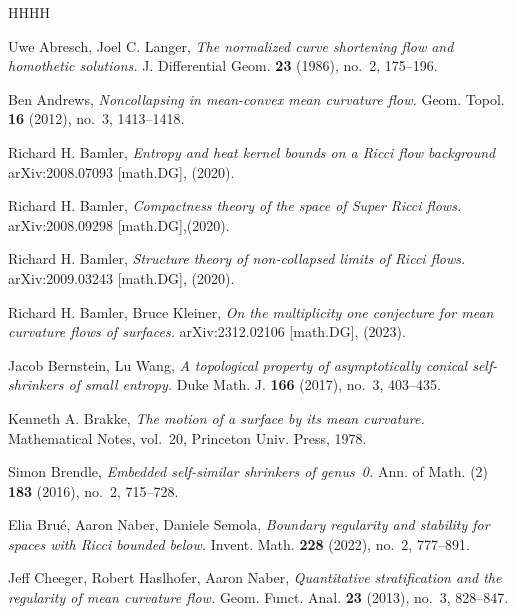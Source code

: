 \documentclass[11pt,reqno]{amsart}
\numberwithin{equation}{section}
\theoremstyle{definition}
\theoremstyle{remark}
\theoremstyle{remark}
\theoremstyle{remark}
\theoremstyle{remark}\newtheorem{conjecture}[equation]{Conjecture}
\theoremstyle{remark}\newtheorem{question}[equation]{Question}
\begin{document}
\begin{thebibliography}{HHHH}







Uwe Abresch, Joel C. Langer,
\emph{The normalized curve shortening flow and homothetic solutions.}
J. Differential Geom. \textbf{23} (1986), no.~2, 175–196.


Ben Andrews,
\emph{Noncollapsing in mean-convex mean curvature flow.}
Geom. Topol. \textbf{16} (2012), no.~3, 1413–1418.



Richard H. Bamler, 
\emph{Entropy and heat kernel bounds on a Ricci flow background}
	arXiv:2008.07093 [math.DG], (2020).


Richard H. Bamler, 
    \emph{Compactness theory of the space of Super Ricci flows.}
	arXiv:2008.09298 [math.DG],(2020).

    Richard H. Bamler, 
 \emph{ Structure theory of non-collapsed limits of Ricci flows.}
	arXiv:2009.03243 [math.DG], (2020).



Richard H. Bamler, Bruce Kleiner,
\emph{On the multiplicity one conjecture for mean curvature flows of surfaces.}
arXiv:2312.02106 [math.DG], (2023).

Jacob Bernstein, Lu Wang,
\emph{A topological property of asymptotically conical self-shrinkers of small entropy.}
Duke Math. J. \textbf{166} (2017), no.~3, 403–435.



Kenneth A. Brakke,
\emph{The motion of a surface by its mean curvature.}
Mathematical Notes, vol.~20, Princeton Univ. Press, 1978.

Simon Brendle,
\emph{Embedded self-similar shrinkers of genus~0.}
Ann. of Math. (2) \textbf{183} (2016), no.~2, 715–728.

Elia Brué, Aaron Naber, Daniele Semola,
\emph{Boundary regularity and stability for spaces with Ricci bounded below.}
Invent. Math. \textbf{228} (2022), no.~2, 777–891.




Jeff Cheeger, Robert Haslhofer, Aaron Naber,
\emph{Quantitative stratification and the regularity of mean curvature flow.}
Geom. Funct. Anal. \textbf{23} (2013), no.~3, 828–847.


\end{thebibliography}
\end{document}
